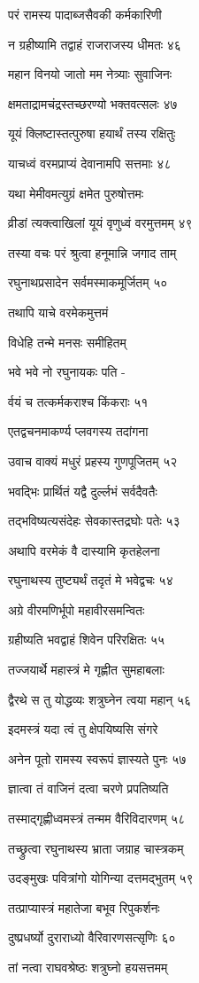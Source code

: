 परं रामस्य पादाब्जसैवकी कर्मकारिणी

न ग्रहीष्यामि तद्वाहं राजराजस्य धीमतः ४६

महान विनयो जातो मम नेत्र्याः सुवाजिनः

क्षमताद्रामचंद्रस्तच्छरण्यो भक्तवत्सलः ४७

यूयं क्लिष्टास्तत्पुरुषा हयार्थं तस्य रक्षितुः

याचध्वं वरमप्राप्यं देवानामपि सत्तमाः ४८

यथा मेमीवमत्युग्रं क्षमेत पुरुषोत्तमः

व्रीडां त्यक्त्वाखिलां यूयं वृणुध्वं वरमुत्तमम् ४९

तस्या वचः परं श्रुत्वा हनूमान्नि जगाद ताम्

रघुनाथप्रसादेन सर्वमस्माकमूर्जितम् ५०

तथापि याचे वरमेकमुत्तमं

विधेहि तन्मे मनसः समीहितम्

भवे भवे नो रघुनायकः पति -

र्वयं च तत्कर्मकराश्च किंकराः ५१

एतद्वचनमाकर्ण्य प्लवगस्य तदांगना

उवाच वाक्यं मधुरं प्रहस्य गुणपूजितम् ५२

भवद्भिः प्रार्थितं यद्वै दुर्ल्लभं सर्वदैवतैः

तद्भविष्यत्यसंदेहः सेवकास्तद्रघोः पतेः ५३

अथापि वरमेकं वै दास्यामि कृतहेलना

रघुनाथस्य तुष्ट्यर्थं तदृतं मे भवेद्वचः ५४

अग्रे वीरमणिर्भूपो महावीरसमन्वितः

ग्रहीष्यति भवद्वाहं शिवेन परिरक्षितः ५५

तज्जयार्थे महास्त्रं मे गृह्णीत सुमहाबलाः

द्वैरथे स तु योद्धव्यः शत्रुघ्नेन त्वया महान् ५६

इदमस्त्रं यदा त्वं तु क्षेपयिष्यसि संगरे

अनेन पूतो रामस्य स्वरूपं ज्ञास्यते पुनः ५७

ज्ञात्वा तं वाजिनं दत्वा चरणे प्रपतिष्यति

तस्माद्गृह्णीध्वमस्त्रं तन्मम वैरिविदारणम् ५८

तच्छ्रुत्वा रघुनाथस्य भ्राता जग्राह चास्त्रकम्

उदङ्मुखः पवित्रांगो योगिन्या दत्तमद्भुतम् ५९

तत्प्राप्यास्त्रं महातेजा बभूव रिपुकर्शनः

दुष्प्रधर्ष्यो दुराराध्यो वैरिवारणसत्सृणिः ६०

तां नत्वा राघवश्रेष्ठः शत्रुघ्नो हयसत्तमम्

